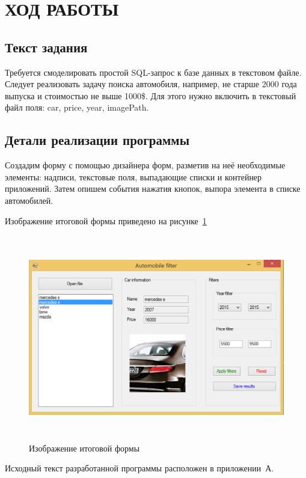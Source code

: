 \section{ХОД РАБОТЫ}

\subsection{Текст задания}

Требуется смоделировать простой SQL-запрос к базе данных в текстовом файле. Следует
реализовать задачу поиска автомобиля, например, не старше 2000 года выпуска и
стоимостью не выше 1000\$. Для этого нужно включить в текстовый файл поля: car,
price, year, imagePath.

\subsection{Детали реализации программы}

Создадим форму с помощью дизайнера форм, разметив на неё необходимые элементы:
надписи, текстовые поля, выпадающие списки и контейнер приложений. Затем опишем
события нажатия кнопок, выпора элемента в списке автомобилей.

Изображение итоговой формы приведено на рисунке~\ref{fig:screen}
\begin{figure}[htbp]
  \centering
  \includegraphics[width=150mm,height=90mm]{img/screen}
  \caption{Изображение итоговой формы}
  \label{fig:screen}
\end{figure}

Исходный текст разработанной программы расположен в приложении~А.

\newpage
